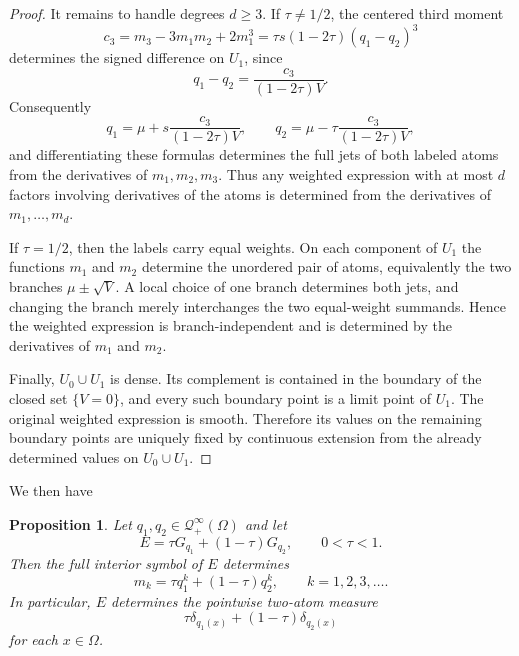 \documentclass[11pt]{article}
\newcommand{\OmegaD}{\Omega}
\theoremstyle{plain}
\newtheorem{proposition}[theorem]{Proposition}
\theoremstyle{definition}
\theoremstyle{remark}
\begin{document}
\begin{proof}
It remains to handle degrees $d\ge3$.  If $\tau\ne1/2$, the centered third moment
\[
  c_3=m_3-3m_1m_2+2m_1^3
  =\tau s(1-2\tau)(q_1-q_2)^3
\]
determines the signed difference on $U_1$, since
\[
  q_1-q_2=\frac{c_3}{(1-2\tau)V}.
\]
Consequently
\[
  q_1=\mu+s\frac{c_3}{(1-2\tau)V},
  \qquad
  q_2=\mu-\tau\frac{c_3}{(1-2\tau)V},
\]
and differentiating these formulas determines the full jets of both labeled atoms from the derivatives of $m_1,m_2,m_3$.  Thus any weighted expression with at most $d$ factors involving derivatives of the atoms is determined from the derivatives of $m_1,\dots,m_d$.

If $\tau=1/2$, then the labels carry equal weights.  On each component of $U_1$ the functions $m_1$ and $m_2$ determine the unordered pair of atoms, equivalently the two branches $\mu\pm\sqrt V$.  A local choice of one branch determines both jets, and changing the branch merely interchanges the two equal-weight summands.  Hence the weighted expression is branch-independent and is determined by the derivatives of $m_1$ and $m_2$.

Finally, $U_0\cup U_1$ is dense.  Its complement is contained in the boundary of the closed set $\{V=0\}$, and every such boundary point is a limit point of $U_1$.  The original weighted expression is smooth.  Therefore its values on the remaining boundary points are uniquely fixed by continuous extension from the already determined values on $U_0\cup U_1$.
\end{proof}

We then have

\begin{proposition}\label{prop:two-atom-Green-moments}
Let $q_1,q_2\in \mathcal Q_+^\infty(\OmegaD)$ and let
\[
  E=\tau G_{q_1}+(1-\tau)G_{q_2},
  \qquad 0<\tau<1.
\]
Then the full interior symbol of $E$ determines
\[
  m_k=\tau q_1^k+(1-\tau)q_2^k,
  \qquad k=1,2,3,\ldots.
\]
In particular, $E$ determines the pointwise two-atom measure
\[
  \tau\delta_{q_1(x)}+(1-\tau)\delta_{q_2(x)}
\]
for each $x\in\OmegaD$.
\end{proposition}
\end{document}
